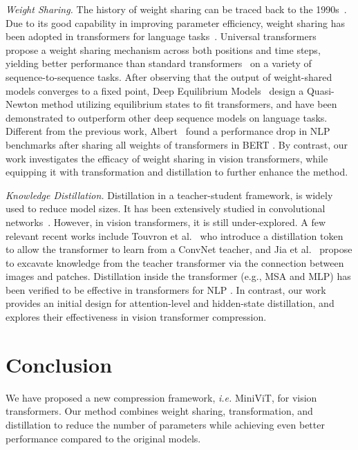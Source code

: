 \documentclass[10pt,twocolumn,letterpaper]{article}
\begin{document}
\textit{Weight Sharing.}
The history of weight sharing can be traced back to the 1990s~\cite{ws_origin, ws_lecun, ws_hinton}. Due to its good capability in improving parameter efficiency,
weight sharing has been adopted in transformers for language tasks~\cite{Albert, LT, ws_trans_ma}. Universal transformers~\cite{UniTransformer} propose a weight sharing mechanism across both positions and time steps, yielding better performance than standard transformers~\cite{vaswani2017attention} on a variety of sequence-to-sequence tasks. After observing that the output of weight-shared models converges to a fixed point, Deep Equilibrium Models~\cite{DEQ} design a Quasi-Newton method utilizing equilibrium states to fit transformers, and have been demonstrated to outperform other deep sequence models on language tasks. Different from the previous work, Albert~\cite{Albert} found a performance drop in NLP benchmarks after sharing all weights of transformers in BERT \cite{bert}. By contrast, our work investigates the efficacy of weight sharing in vision transformers, while equipping it with transformation and distillation to further enhance the method.

\textit{Knowledge Distillation.} Distillation in a teacher-student framework, is widely used to reduce model sizes. It has been extensively studied in convolutional networks~\cite{gou2021knowledge}. However, in vision transformers, it is still under-explored. A few relevant recent works include Touvron et al.~\cite{deit} who introduce a distillation token to allow the transformer to learn from a ConvNet teacher, and Jia et al.~\cite{jia2021efficient} propose to excavate knowledge from the teacher transformer via the connection between images and patches. 
Distillation inside the transformer (e.g., MSA and MLP) has been verified to be effective in transformers for NLP \cite{tinybert, mobilebert, minilm, minilmv2}. In contrast, our work provides an initial design for attention-level and hidden-state distillation, and explores their effectiveness in vision transformer compression.

\vspace{-0.2cm}
    \section{Conclusion}
    
    We have proposed a new compression framework, \emph{i.e.} MiniViT, for vision transformers. Our method combines weight sharing, transformation, and distillation to reduce the number of parameters while achieving even better performance compared to the original models.
\end{document}
